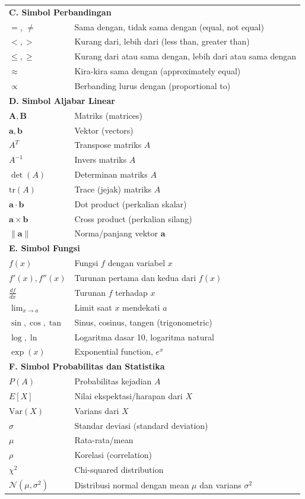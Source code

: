 \begin{tabularx}{\textwidth}{@{} l X @{}}
\multicolumn{2}{l}{\textbf{C. Simbol Perbandingan}} \\
$=$, $\neq$ & Sama dengan, tidak sama dengan (equal, not equal) \\
$<, >$ & Kurang dari, lebih dari (less than, greater than) \\
$\leq, \geq$ & Kurang dari atau sama dengan, lebih dari atau sama dengan \\
$\approx$ & Kira-kira sama dengan (approximately equal) \\
$\propto$ & Berbanding lurus dengan (proportional to) \\

\multicolumn{2}{l}{\textbf{D. Simbol Aljabar Linear}} \\
$\mathbf{A}, \mathbf{B}$ & Matriks (matrices) \\
$\mathbf{a}, \mathbf{b}$ & Vektor (vectors) \\
$A^T$ & Transpose matriks $A$ \\
$A^{-1}$ & Invers matriks $A$ \\
$\det(A)$ & Determinan matriks $A$ \\
$\text{tr}(A)$ & Trace (jejak) matriks $A$ \\
$\mathbf{a} \cdot \mathbf{b}$ & Dot product (perkalian skalar) \\
$\mathbf{a} \times \mathbf{b}$ & Cross product (perkalian silang) \\
$\|\mathbf{a}\|$ & Norma/panjang vektor $\mathbf{a}$ \\

\multicolumn{2}{l}{\textbf{E. Simbol Fungsi}} \\
$f(x)$ & Fungsi $f$ dengan variabel $x$ \\
$f'(x), f''(x)$ & Turunan pertama dan kedua dari $f(x)$ \\
$\frac{df}{dx}$ & Turunan $f$ terhadap $x$ \\
$\lim_{x \to a}$ & Limit saat $x$ mendekati $a$ \\
$\sin, \cos, \tan$ & Sinus, cosinus, tangen (trigonometric) \\
$\log, \ln$ & Logaritma dasar 10, logaritma natural \\
$\exp(x)$ & Exponential function, $e^x$ \\

\multicolumn{2}{l}{\textbf{F. Simbol Probabilitas dan Statistika}} \\
$P(A)$ & Probabilitas kejadian $A$ \\
$E[X]$ & Nilai ekspektasi/harapan dari $X$ \\
$\text{Var}(X)$ & Varians dari $X$ \\
$\sigma$ & Standar deviasi (standard deviation) \\
$\mu$ & Rata-rata/mean \\
$\rho$ & Korelasi (correlation) \\
$\chi^2$ & Chi-squared distribution \\
$\mathcal{N}(\mu, \sigma^2)$ & Distribusi normal dengan mean $\mu$ dan varians $\sigma^2$ \\


\end{tabularx}
